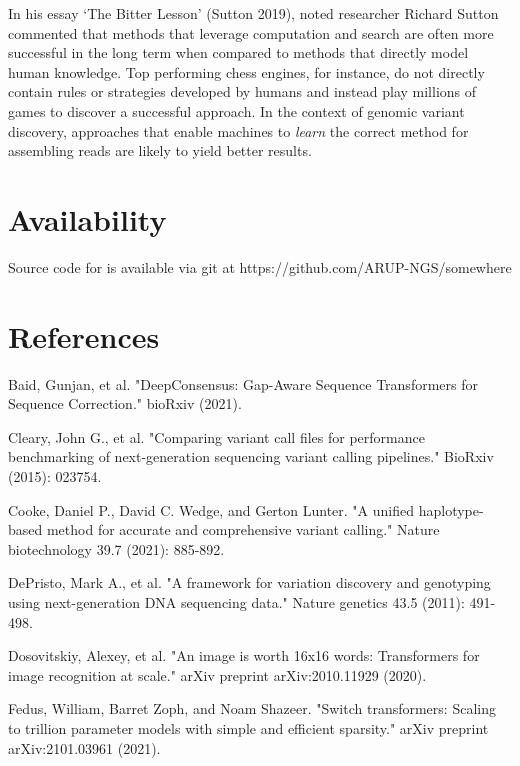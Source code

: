 \documentclass[]{article}
\begin{document}
In his essay `The Bitter Lesson' (Sutton 2019), noted researcher Richard Sutton commented that methods that leverage computation and search are often more successful in the long term when compared to methods that directly model human knowledge. Top performing chess engines, for instance, do not directly contain rules or strategies developed by humans and instead play millions of games to discover a successful approach. In the context of genomic variant discovery, approaches that enable machines to \textit{learn} the correct method for assembling reads are likely to yield better results.  

\section{Availability}
 
 Source code for is available via git at https://github.com/ARUP-NGS/somewhere
 
\section{References}

\vspace{8pt}
Baid, Gunjan, et al. "DeepConsensus: Gap-Aware Sequence Transformers for Sequence Correction." bioRxiv (2021).

\vspace{8pt}
Cleary, John G., et al. "Comparing variant call files for performance benchmarking of next-generation sequencing variant calling pipelines." BioRxiv (2015): 023754.

\vspace{8pt}
Cooke, Daniel P., David C. Wedge, and Gerton Lunter. "A unified haplotype-based method for accurate and comprehensive variant calling." Nature biotechnology 39.7 (2021): 885-892.

\vspace{8pt}
DePristo, Mark A., et al. "A framework for variation discovery and genotyping using next-generation DNA sequencing data." Nature genetics 43.5 (2011): 491-498.
 
\vspace{8pt}
Dosovitskiy, Alexey, et al. "An image is worth 16x16 words: Transformers for image recognition at scale." arXiv preprint arXiv:2010.11929 (2020).

\vspace{8pt}
Fedus, William, Barret Zoph, and Noam Shazeer. "Switch transformers: Scaling to trillion parameter models with simple and efficient sparsity." arXiv preprint arXiv:2101.03961 (2021).
\end{document}
